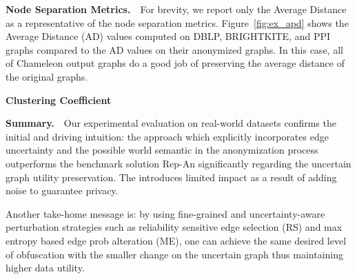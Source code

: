\textbf{Node Separation Metrics.}~~For brevity, we report only the Average Distance as a representative of the node separation metrics. Figure~\ref{fig:ex_apd} shows the Average Distance (AD) values computed on DBLP, BRIGHTKITE, and PPI graphs compared to the AD values on their anonymized graphs. In this case, all of Chameleon output graphs do a good job of preserving the average distance of the original graphs. 

\textbf{Clustering Coefficient}


\textbf{Summary.}~~Our experimental evaluation on real-world datasets confirms the initial and driving intuition: the {\SysNameNS} approach which explicitly incorporates edge uncertainty and the possible world semantic in the anonymization process outperforms the benchmark solution Rep-An significantly regarding the uncertain graph utility preservation. The {\SysNameNS} introduces limited impact as a result of adding noise to guarantee privacy. 

Another take-home message is: by using fine-grained and uncertainty-aware perturbation strategies such as reliability sensitive edge selection (RS) and max entropy based edge prob alteration (ME), one can achieve the same desired level of obfuscation with the smaller change on the uncertain graph thus maintaining higher data utility. 




